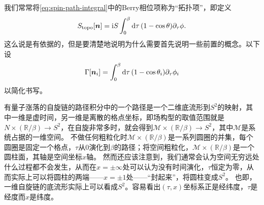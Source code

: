 我们常常将\eqref{eq:spin-path-integral}中的Berry相位项称为“拓扑项”，即定义
\begin{equation}
    S_\text{topo}[\vb*{n}] = \mathrm{i} S \int_0^\beta \dd{\tau} (1 - \cos \theta) \partial_\tau \phi.
    \label{eq:single-spin-topo-term}
\end{equation}
这么说是有依据的，但是要清楚地说明为什么需要首先说明一些前置的概念。以下设
\begin{equation}
    \Gamma[\vb*{n}_i] = \int_0^\beta \dd{\tau} (1- \cos \theta_i) \partial_\tau \phi_i
\end{equation}
以简化书写。

有量子涨落的自旋链的路径积分中的一个路径是一个二维底流形到$S^2$的映射，其中一维是虚时间，另一维是离散的格点坐标，即场构型的取值范围就是$N \times (\mathbb{R} / \beta) \to S^2$，在自旋非常多时，就会得到$\mathcal{M} \times (\mathbb{R} / \beta) \to S^2$，其中$\mathcal{M}$是系统占据的一维空间。
不做任何粗粒化时$\mathcal{M} \times (\mathbb{R} / \beta)$是一系列圆圈的并集，每个圆圈是固定一个格点，$\tau$从$0$演化到$\beta$的路径；将空间粗粒化，$\mathcal{M} \times (\mathbb{R} / \beta)$是一个圆柱面，其轴是空间坐标$x$轴。
然而还应该注意到，我们通常会认为空间无穷远处什么过程都不会发生，从而在$x = \pm \infty$处可以认为没有时间演化，$\tau$恒定为零，从而实际上可以将圆柱的两端——$x = \pm 1$处——“封起来”，将圆柱变成$S^2$。
也即，一维自旋链的底流形实际上可以看成$S^2$。容易看出$(\tau, x)$坐标系正是经纬度，$\tau$是经度而$x$是纬度。

